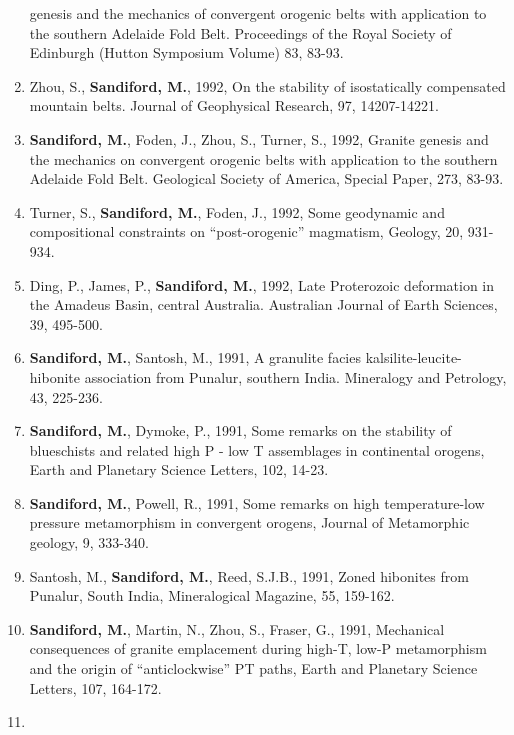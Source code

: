 \documentclass[
]{article}
\begin{document}
\begin{enumerate}
  genesis and the mechanics of convergent orogenic belts with
  application to the southern Adelaide Fold Belt. Proceedings of the
  Royal Society of Edinburgh (Hutton Symposium Volume) 83, 83-93.
\item
  Zhou, S., \textbf{Sandiford, M.}, 1992, On the stability of
  isostatically compensated mountain belts. Journal of Geophysical
  Research, 97, 14207-14221. 
\item
  \textbf{Sandiford, M.}, Foden, J., Zhou, S., Turner, S., 1992, Granite
  genesis and the mechanics on convergent orogenic belts with
  application to the southern Adelaide Fold Belt. Geological Society of
  America, Special Paper, 273, 83-93.
\item
  Turner, S., \textbf{Sandiford, M.}, Foden, J., 1992, Some geodynamic
  and compositional constraints on ``post-orogenic'' magmatism, Geology,
  20, 931-934. 
\item
  Ding, P., James, P., \textbf{Sandiford, M.}, 1992, Late Proterozoic
  deformation in the Amadeus Basin, central Australia. Australian
  Journal of Earth Sciences, 39, 495-500. 
\item
  \textbf{Sandiford, M.}, Santosh, M., 1991, A granulite facies
  kalsilite-leucite-hibonite association from Punalur, southern India.
  Mineralogy and Petrology, 43, 225-236.
\item
  \textbf{Sandiford, M.}, Dymoke, P., 1991, Some remarks on the
  stability of blueschists and related high P - low T assemblages in
  continental orogens, Earth and Planetary Science Letters, 102, 14-23.
\item
  \textbf{Sandiford, M.}, Powell, R., 1991, Some remarks on high
  temperature-low pressure metamorphism in convergent orogens, Journal
  of Metamorphic geology, 9, 333-340. 
\item
  Santosh, M., \textbf{Sandiford, M.}, Reed, S.J.B., 1991, Zoned
  hibonites from Punalur, South India, Mineralogical Magazine, 55,
  159-162. 
\item
  \textbf{Sandiford, M.}, Martin, N., Zhou, S., Fraser, G., 1991,
  Mechanical consequences of granite emplacement during high-T, low-P
  metamorphism and the origin of ``anticlockwise'' PT paths, Earth and
  Planetary Science Letters, 107, 164-172. 
\item

\end{enumerate}
\end{document}
